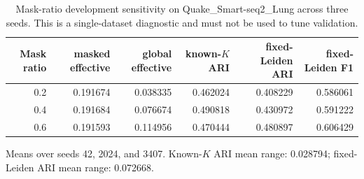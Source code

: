 \begin{table}[ht]
\centering
\caption{Mask-ratio development sensitivity on Quake\_Smart-seq2\_Lung across three seeds. This is a single-dataset diagnostic and must not be used to tune validation.}
\label{tab:mask-ratio-smoke}
\scriptsize
\begin{tabular}{rrrrrr}
\toprule
Mask ratio & masked effective & global effective & known-\(K\) ARI & fixed-Leiden ARI & fixed-Leiden F1 \\
\midrule
0.2 & 0.191674 & 0.038335 & 0.462024 & 0.408229 & 0.586061 \\
0.4 & 0.191684 & 0.076674 & 0.490818 & 0.430972 & 0.591222 \\
0.6 & 0.191593 & 0.114956 & 0.470444 & 0.480897 & 0.606429 \\
\bottomrule
\end{tabular}

\footnotesize{Means over seeds 42, 2024, and 3407. Known-\(K\) ARI mean range: 0.028794; fixed-Leiden ARI mean range: 0.072668.}
\end{table}
